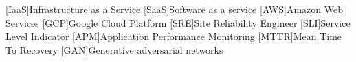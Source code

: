 [IaaS]{Infrastructure as a Service}
[SaaS]{Software as a service}
[AWS]{Amazon Web Services}
[GCP]{Google Cloud Platform}
[SRE]{Site Reliability Engineer}
[SLI]{Service Level Indicator}
[APM]{Application Performance Monitoring}
[MTTR]{Mean Time To Recovery}
[GAN]{Generative adversarial networks}
